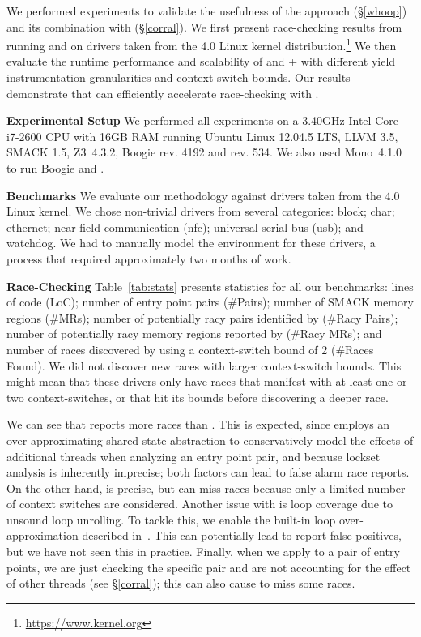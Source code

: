We performed experiments to validate the usefulness of the \whoop approach (\S\ref{whoop}) and its combination with \corral (\S\ref{corral}). We first present race-checking results from running \whoop and \corral on \sizeOfBenchmarks drivers taken from the 4.0 Linux kernel distribution.\footnote{\url{https://www.kernel.org}} We then evaluate the runtime performance and scalability of \corral and \whoop + \corral with different yield instrumentation granularities and context-switch bounds.
Our results demonstrate that \whoop can efficiently accelerate race-checking with \corral.

\medskip\noindent\textbf{Experimental Setup }
%
We performed all experiments on a 3.40GHz Intel Core i7-2600 CPU with 16GB RAM running Ubuntu Linux 12.04.5 LTS, LLVM 3.5, SMACK 1.5, Z3~4.3.2, Boogie rev. 4192 and \corral rev. 534. We also used Mono~4.1.0 to run Boogie and \corral.

\medskip\noindent\textbf{Benchmarks }
%
We evaluate our methodology against \sizeOfBenchmarks drivers taken from the 4.0 Linux kernel. We chose non-trivial drivers from several categories: block; char; ethernet; near field communication (nfc); universal serial bus (usb); and watchdog. We had to manually model the environment for these drivers, a process that required approximately two months of work.

\medskip\noindent\textbf{Race-Checking }
%
Table~\ref{tab:stats} presents statistics for all our benchmarks: lines of code (LoC); number of entry point pairs (\#Pairs); number of SMACK memory regions (\#MRs); number of potentially racy pairs identified by \whoop (\#Racy Pairs); number of potentially racy memory regions reported by \whoop (\#Racy MRs); and number of races discovered by \corral using a context-switch bound of 2 (\#Races Found). We did not discover new races with larger context-switch bounds. This might mean that these drivers only have races that manifest with at least one or two context-switches, or that \corral hit its bounds before discovering a deeper race.

We can see that \whoop reports more races than \corral. This is expected, since \whoop employs an over-approximating shared state abstraction to conservatively model the effects of additional threads when analyzing an entry point pair, and because lockset analysis is inherently imprecise; both factors can lead to false alarm race reports.  On the other hand, \corral is precise, but can miss races because only a limited number of context switches are considered.  Another issue with \corral is loop coverage due to unsound loop unrolling. To tackle this, we enable the built-in loop over-approximation described in~\cite{lal2014powering}. This can potentially lead \corral to report false positives, but we have not seen this in practice. Finally, when we apply \corral to a pair of entry points, we are just checking the specific pair and are not accounting for the effect of other threads (see \S\ref{corral}); this can also cause \corral to miss some races.


